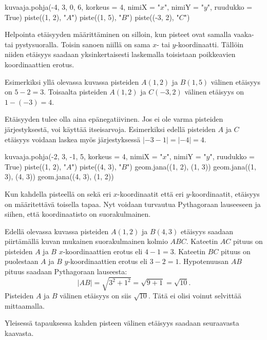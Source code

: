 \begin{kuva}
    kuvaaja.pohja(-4, 3, 0, 6, korkeus = 4, nimiX = "$x$", nimiY = "$y$", ruudukko = True)
    piste((1, 2), "$A$")
    piste((1, 5), "$B$")
    piste((-3, 2), "$C$")
\end{kuva}

Helpointa etäisyyden määrittäminen on silloin, kun pisteet ovat samalla vaaka- tai pystysuoralla.
Toisin sanoen niillä on sama $x$- tai $y$-koordinaatti.
Tällöin niiden etäisyys saadaan yksinkertaisesti laskemalla toisistaan poikkeavien koordinaattien erotus.

Esimerkiksi yllä olevassa kuvassa pisteiden $A(1, 2)$ ja $B(1, 5)$ välinen etäisyys on $5-2=3$.
Toisaalta pisteiden $A(1, 2)$ ja $C(-3, 2)$ välinen etäisyys on $1-(-3)=4$.

Etäisyyden tulee olla aina epänegatiivinen.
Jos ei ole varma pisteiden järjestyksestä, voi käyttää itseisarvoja.
Esimerkiksi edellä pisteiden $A$ ja $C$ etäisyys voidaan laskea myös järjestyksessä $|-3-1|=|-4|=4$.


\begin{kuva}
    kuvaaja.pohja(-2, 3, -1, 5, korkeus = 4, nimiX = "$x$", nimiY = "$y$", ruudukko = True)
    piste((1, 2), "$A$")
    piste((4, 3), "$B$")
    geom.jana((1, 2), (1, 3))
    geom.jana((1, 3), (4, 3))
    geom.jana((4, 3), (1, 2))
\end{kuva}

Kun kahdella pisteellä on sekä eri $x$-koordinaatit että eri $y$-koordinaatit, etäisyys on määritettävä toisella tapaa.
Nyt voidaan turvautua Pythagoraan lauseeseen ja siihen, että koordinaatisto on suorakulmainen.

Edellä olevassa kuvassa pisteiden $A(1, 2)$ ja $B(4, 3)$ etäisyys saadaan piirtämällä kuvan mukainen suorakulmainen kolmio $ABC$.
Kateetin $AC$ pituus on pisteiden $A$ ja $B$ $x$-koordinaattien erotus eli $4-1=3$.
Kateetin $BC$ pituus on puolestaan $A$ ja $B$ $y$-koordinaattien erotus eli $3-2=1$.
Hypotenuusan $AB$ pituus saadaan Pythagoraan lauseesta:
\[
|AB|=\sqrt{3^2+1^2}=\sqrt{9+1}=\sqrt{10}.
\]
Pisteiden $A$ ja $B$ välinen etäisyys on siis $\sqrt{10}$.
Tätä ei olisi voinut selvittää mittaamalla.

Yleisessä tapauksessa kahden pisteen välinen etäisyys saadaan seuraavasta kaavasta.

